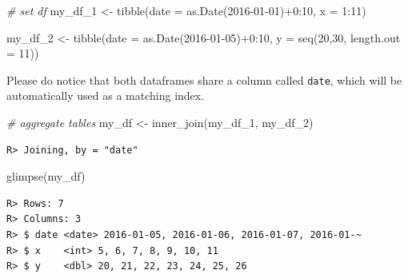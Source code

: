 \documentclass[
  12pt,
]{book}
\newenvironment{Shaded}{\begin{snugshade}}{\end{snugshade}}
\newcommand{\AttributeTok}[1]{\textcolor[rgb]{0.61,0.61,0.61}{#1}}
\newcommand{\CommentTok}[1]{\textcolor[rgb]{0.37,0.37,0.37}{\textit{#1}}}
\newcommand{\DecValTok}[1]{\textcolor[rgb]{0.06,0.06,0.06}{#1}}
\newcommand{\FunctionTok}[1]{\textcolor[rgb]{0,0,0}{#1}}
\newcommand{\NormalTok}[1]{#1}
\newcommand{\OtherTok}[1]{\textcolor[rgb]{0.37,0.37,0.37}{#1}}
\newcommand{\SpecialCharTok}[1]{\textcolor[rgb]{0,0,0}{#1}}
\newcommand{\StringTok}[1]{\textcolor[rgb]{0.5,0.5,0.5}{#1}}
\begin{document}
\begin{Shaded}
\begin{Highlighting}[]
\CommentTok{\# set df}
\NormalTok{my\_df\_1 }\OtherTok{\textless{}{-}} \FunctionTok{tibble}\NormalTok{(}\AttributeTok{date =} \FunctionTok{as.Date}\NormalTok{(}\StringTok{\textquotesingle{}2016{-}01{-}01\textquotesingle{}}\NormalTok{)}\SpecialCharTok{+}\DecValTok{0}\SpecialCharTok{:}\DecValTok{10}\NormalTok{,}
                  \AttributeTok{x =} \DecValTok{1}\SpecialCharTok{:}\DecValTok{11}\NormalTok{)}

\NormalTok{my\_df\_2 }\OtherTok{\textless{}{-}} \FunctionTok{tibble}\NormalTok{(}\AttributeTok{date =} \FunctionTok{as.Date}\NormalTok{(}\StringTok{\textquotesingle{}2016{-}01{-}05\textquotesingle{}}\NormalTok{)}\SpecialCharTok{+}\DecValTok{0}\SpecialCharTok{:}\DecValTok{10}\NormalTok{,}
                  \AttributeTok{y =} \FunctionTok{seq}\NormalTok{(}\DecValTok{20}\NormalTok{,}\DecValTok{30}\NormalTok{, }\AttributeTok{length.out =} \DecValTok{11}\NormalTok{))}
\end{Highlighting}
\end{Shaded}

Please do notice that both dataframes share a column called \texttt{date}, which will be automatically used as a matching index.

\begin{Shaded}
\begin{Highlighting}[]
\CommentTok{\# aggregate tables}
\NormalTok{my\_df }\OtherTok{\textless{}{-}} \FunctionTok{inner\_join}\NormalTok{(my\_df\_1, }
\NormalTok{                    my\_df\_2)}
\end{Highlighting}
\end{Shaded}

\begin{verbatim}
R> Joining, by = "date"
\end{verbatim}

\begin{Shaded}
\begin{Highlighting}[]
\FunctionTok{glimpse}\NormalTok{(my\_df)}
\end{Highlighting}
\end{Shaded}

\begin{verbatim}
R> Rows: 7
R> Columns: 3
R> $ date <date> 2016-01-05, 2016-01-06, 2016-01-07, 2016-01-~
R> $ x    <int> 5, 6, 7, 8, 9, 10, 11
R> $ y    <dbl> 20, 21, 22, 23, 24, 25, 26
\end{verbatim}
\end{document}
